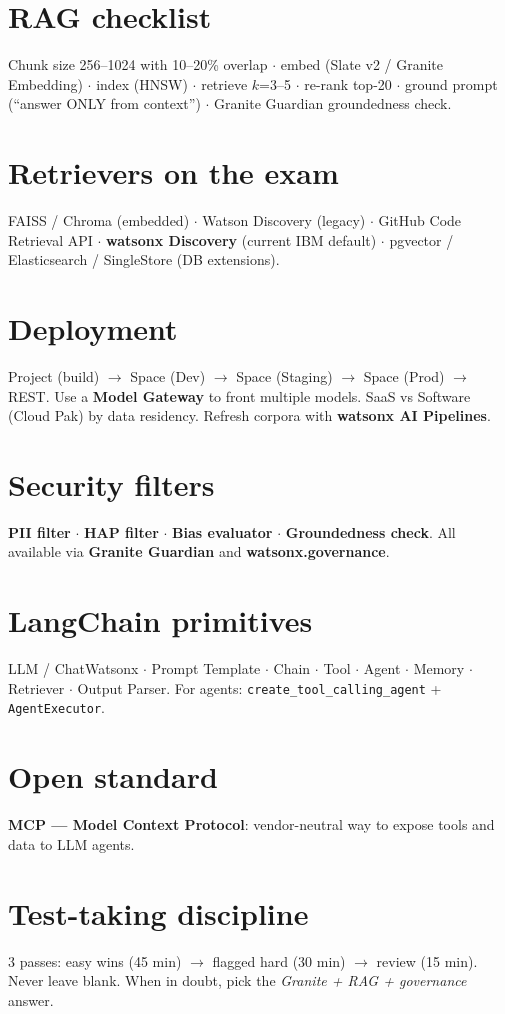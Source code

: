 \section*{RAG checklist}
Chunk size 256--1024 with 10--20\% overlap $\cdot$ embed (Slate v2 / Granite Embedding) $\cdot$ index (HNSW) $\cdot$ retrieve $k$=3--5 $\cdot$ re-rank top-20 $\cdot$ ground prompt (``answer ONLY from context'') $\cdot$ Granite Guardian groundedness check.

\section*{Retrievers on the exam}
FAISS / Chroma (embedded) $\cdot$ Watson Discovery (legacy) $\cdot$ GitHub Code Retrieval API $\cdot$ \textbf{watsonx Discovery} (current IBM default) $\cdot$ pgvector / Elasticsearch / SingleStore (DB extensions).

\section*{Deployment}
Project (build) $\to$ Space (Dev) $\to$ Space (Staging) $\to$ Space (Prod) $\to$ REST. Use a \textbf{Model Gateway} to front multiple models. SaaS vs Software (Cloud Pak) by data residency. Refresh corpora with \textbf{watsonx AI Pipelines}.

\section*{Security filters}
\textbf{PII filter} $\cdot$ \textbf{HAP filter} $\cdot$ \textbf{Bias evaluator} $\cdot$ \textbf{Groundedness check}. All available via \textbf{Granite Guardian} and \textbf{watsonx.governance}.

\section*{LangChain primitives}
LLM / ChatWatsonx $\cdot$ Prompt Template $\cdot$ Chain $\cdot$ Tool $\cdot$ Agent $\cdot$ Memory $\cdot$ Retriever $\cdot$ Output Parser. For agents: \texttt{create\_tool\_calling\_agent} + \texttt{AgentExecutor}.

\section*{Open standard}
\textbf{MCP --- Model Context Protocol}: vendor-neutral way to expose tools and data to LLM agents.

\section*{Test-taking discipline}
3 passes: easy wins (45 min) $\to$ flagged hard (30 min) $\to$ review (15 min). Never leave blank. When in doubt, pick the \emph{Granite + RAG + governance} answer.

\cleardoublepage
